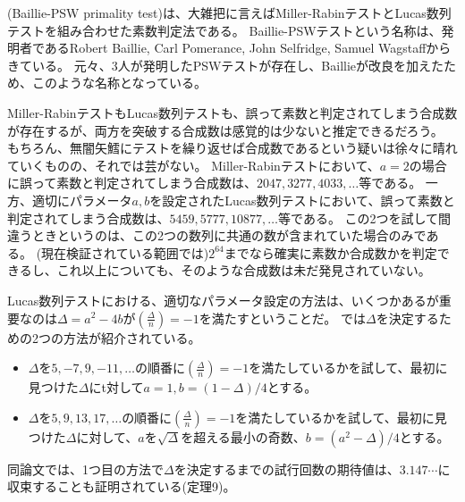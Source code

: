 (Baillie-PSW primality test)は、大雑把に言えばMiller-RabinテストとLucas数列テストを組み合わせた素数判定法である。
Baillie-PSWテストという名称は、発明者であるRobert Baillie, Carl Pomerance, John Selfridge, Samuel Wagstaffからきている。
元々、3人が発明したPSWテストが存在し、Baillieが改良を加えたため、このような名称となっている。

Miller-RabinテストもLucas数列テストも、誤って素数と判定されてしまう合成数が存在するが、両方を突破する合成数は感覚的は少ないと推定できるだろう。
もちろん、無闇矢鱈にテストを繰り返せば合成数であるという疑いは徐々に晴れていくものの、それでは芸がない。
Miller-Rabinテストにおいて、$a=2$の場合に誤って素数と判定されてしまう合成数は、$2047, 3277, 4033,\ldots$等である。
一方、適切にパラメータ$a,b$を設定されたLucas数列テストにおいて、誤って素数と判定されてしまう合成数は、$5459, 5777, 10877,\ldots$等である。
この2つを試して間違うときというのは、この2つの数列に共通の数が含まれていた場合のみである。
(現在検証されている範囲では)$2^64$までなら確実に素数か合成数かを判定できるし、これ以上についても、そのような合成数は未だ発見されていない。

Lucas数列テストにおける、適切なパラメータ設定の方法は、いくつかあるが重要なのは$\Delta=a^2-4b$が$\left(\frac{\Delta}{n}\right)=-1$を満たすということだ。
\cite{selfridge_method}では$\Delta$を決定するための2つの方法が紹介されている。
\begin{itemize}
 \item $\Delta$を$5,-7,9,-11,\ldots$の順番に$\left(\frac{\Delta}{n}\right)=-1$を満たしているかを試して、最初に見つけた$\Delta$にt対して$a=1,b=(1-\Delta)/4$とする。
 \item $\Delta$を$5,9,13,17,\ldots$の順番に$\left(\frac{\Delta}{n}\right)=-1$を満たしているかを試して、最初に見つけた$\Delta$に対して、$a$を$\sqrt{\Delta}$を超える最小の奇数、$b=(a^2-\Delta)/4$とする。
\end{itemize}
同論文では、1つ目の方法で$\Delta$を決定するまでの試行回数の期待値は、$3.147\cdots$に収束することも証明されている(\cite{selfridge_method}定理9)。


